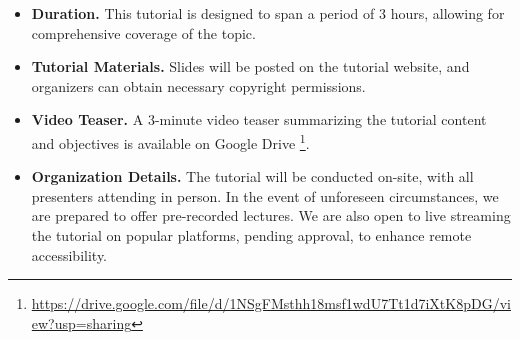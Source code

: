 


\begin{itemize}[left=0pt]
    \item \textbf{Duration.} This tutorial is designed to span a period of 3 hours, allowing for comprehensive coverage of the topic.
    
    \item \textbf{Tutorial Materials.} Slides will be posted on the tutorial website, and organizers can obtain necessary copyright permissions.
    
    \item \textbf{Video Teaser.} A 3-minute video teaser summarizing the tutorial content and objectives is available on Google Drive \footnote{\url{https://drive.google.com/file/d/1NSgFMsthh18msf1wdU7Tt1d7iXtK8pDG/view?usp=sharing}}. 
    
    \item \textbf{Organization Details.} The tutorial will be conducted on-site, with all presenters attending in person. In the event of unforeseen circumstances, we are prepared to offer pre-recorded lectures. We are also open to live streaming the tutorial on popular platforms, pending approval, to enhance remote accessibility.
\end{itemize}